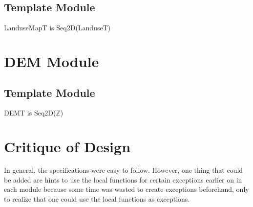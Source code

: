 \documentclass[12pt]{article}
\begin{document}
\subsection* {Template Module}

LanduseMapT is Seq2D(LanduseT)

\section* {DEM Module}

\subsection* {Template Module}

DEMT is Seq2D($\mathbb{Z}$)

\newpage

\section*{Critique of Design}

In general, the specifications were easy to follow. However, one thing that could be added are hints to use the local functions for certain exceptions earlier on in each module because some time was wasted to create exceptions beforehand, only to realize that one could use the local functions as exceptions.
\end{document}
